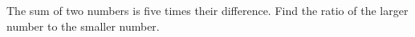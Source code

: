 The sum of two numbers is five times their difference. Find the ratio of the larger number to the smaller number.
